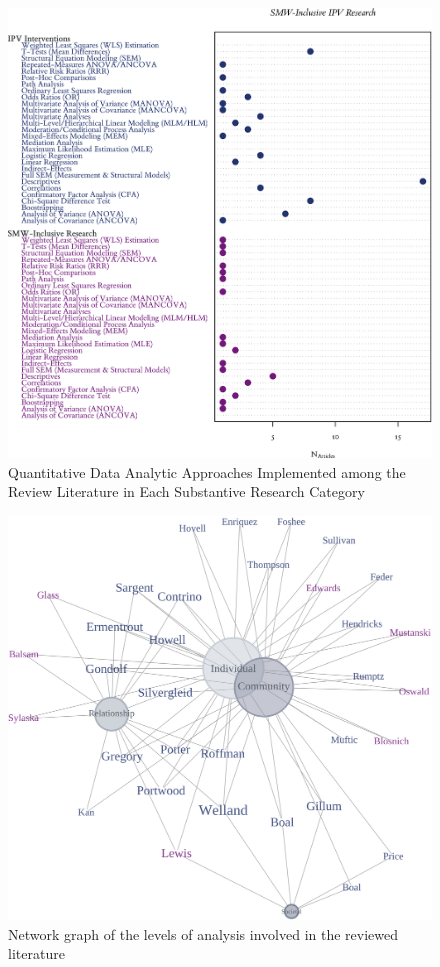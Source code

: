 \documentclass[11pt,]{tufte-book}
\begin{document}
\newpage

\begin{figure}
\centering
\includegraphics{graphics/inputs/aqt.png}
\caption{Quantitative Data Analytic Approaches Implemented among the
Review Literature in Each Substantive Research Category\label{fig:aqt}}
\end{figure}

\newpage

\begin{figure}
\centering
\includegraphics{graphics/inputs/keysnet.png}
\caption{Network graph of the levels of analysis involved in the
reviewed literature\label{fig:keysnet}}
\end{figure}
\end{document}
